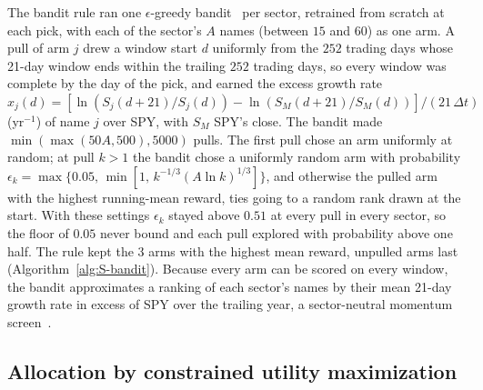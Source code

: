The bandit rule ran one $\epsilon$-greedy bandit~\cite{lattimoreSzepesvari2020} per sector, retrained from scratch at
each pick, with each of the sector's $A$ names (between $15$ and $60$) as one arm. A pull of arm $j$ drew a window
start $d$ uniformly from the $252$ trading days whose 21-day window ends within the trailing $252$ trading days, so
every window was complete by the day of the pick, and earned the excess growth rate
$x_j(d) = [\ln(S_j(d+21)/S_j(d)) - \ln(S_M(d+21)/S_M(d))]/(21\,\Delta t)$ (yr$^{-1}$) of name $j$ over SPY, with
$S_M$ SPY's close. The bandit made $\min(\max(50A, 500), 5000)$ pulls. The first pull chose an arm uniformly at
random; at pull $k > 1$ the bandit chose a uniformly random arm with probability
$\epsilon_k = \max\{0.05,\, \min[1,\, k^{-1/3} (A \ln k)^{1/3}]\}$, and otherwise the pulled arm with the highest
running-mean reward, ties going to a random rank drawn at the start. With these settings $\epsilon_k$ stayed above
$0.51$ at every pull in every sector, so the floor of $0.05$ never bound and each pull explored with probability
above one half. The rule kept the $3$ arms with the highest mean reward, unpulled arms last
(Algorithm~\ref{alg:S-bandit}). Because every arm can be scored on every window, the bandit approximates a ranking of
each sector's names by their mean 21-day growth rate in excess of SPY over the trailing year, a sector-neutral
momentum screen~\cite{jegadeesh1993}.


\subsection{Allocation by constrained utility maximization}\label{sec:method-allocation}

